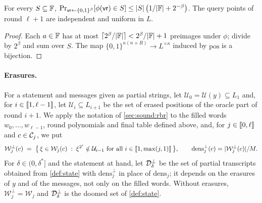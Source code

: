 \begin{lemma}\label{lem:sampling}
For every $S \subseteq \mathbb{F}$, $\Pr_{\mathsf{vr} \leftarrow \{0,1\}^\beta}[\phi(\mathsf{vr}) \in S] \le |S|\,\bigl(1/|\mathbb{F}| + 2^{-\beta}\bigr)$.
The query points of round $\ell+1$ are independent and uniform in $L$.
\end{lemma}

\begin{proof}
Each $a \in \mathbb{F}$ has at most $\lceil 2^\beta/|\mathbb{F}| \rceil < 2^\beta/|\mathbb{F}| + 1$ preimages under $\phi$; divide by $2^\beta$ and sum over $S$.
The map $\{0,1\}^{\kappa(n+R)} \to L^{\times\kappa}$ induced by $\mathrm{pos}$ is a bijection.
\end{proof}

\paragraph{Erasures.}
For a statement and messages given as partial strings, let $\mathcal{U}_0 = \mathcal{U}(y) \subseteq L_1$ and, for $i \in \llbracket 1, \ell-1 \rrbracket$, let $\mathcal{U}_i \subseteq L_{i+1}$ be the set of erased positions of the oracle part of round $i+1$.
We apply the notation of \cref{sec:sound:rbr} to the filled words $w_0, \dots, w_{\ell-1}$, round polynomials and final table defined above, and, for $j \in \llbracket 0, \ell \rrbracket$ and $c \in \mathcal{C}_j$, we put
\[
  \mathcal{W}^{\bot}_j(c) \;=\; \bigl\{\, \xi \in \mathcal{W}_j(c) \;:\; \xi^{2^{i}} \notin \mathcal{U}_{i-1} \text{ for all } i \in \llbracket 1, \max(j,1) \rrbracket \,\bigr\}, \qquad \mathrm{dens}^{\bot}_j(c) = |\mathcal{W}^{\bot}_j(c)|/M.
\]
For $\delta \in (0,\delta^*]$ and the statement at hand, let $\mathcal{D}^{\bot}_\delta$ be the set of partial transcripts obtained from \cref{def:state} with $\mathrm{dens}^{\bot}_j$ in place of $\mathrm{dens}_j$; it depends on the erasures of $y$ and of the messages, not only on the filled words.
Without erasures, $\mathcal{W}^{\bot}_j = \mathcal{W}_j$ and $\mathcal{D}^{\bot}_\delta$ is the doomed set of \cref{def:state}.


